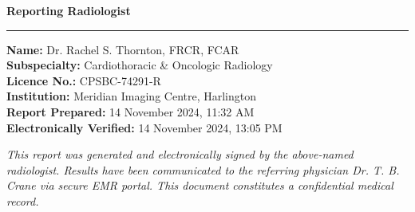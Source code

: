 \documentclass[11pt,a4paper]{article}
\newcommand{\subsectionrule}{%
  \vspace{1pt}%
  {\color{RadRule}\rule{\linewidth}{0.5pt}}%
  \vspace{3pt}%
}
\begin{document}
\vspace{10pt}


\begin{tcolorbox}[slatebox]
\noindent\textbf{\color{RadBlue}\faPen\hspace{4pt}Reporting Radiologist}
\vspace{5pt}

\subsectionrule{}

\vspace{2pt}
\noindent
\begin{minipage}[t]{0.55\linewidth}
  \small
  \textbf{Name:} Dr. Rachel S. Thornton, FRCR, FCAR\\[2pt]
  \textbf{Subspecialty:} Cardiothoracic \& Oncologic Radiology\\[2pt]
  \textbf{Licence No.:} CPSBC-74291-R\\[2pt]
  \textbf{Institution:} Meridian Imaging Centre, Harlington\\[2pt]
  \textbf{Report Prepared:} 14 November 2024, 11:32 AM\\[2pt]
  \textbf{Electronically Verified:} 14 November 2024, 13:05 PM\\[4pt]
  \begin{tcolorbox}[
    enhanced, colback=RadLight, colframe=RadTeal, arc=3pt, boxrule=0.5pt,
    left=6pt, right=6pt, top=4pt, bottom=4pt,
  ]
    \tiny\color{RadSlate}
    \textit{This report was generated and electronically signed by the above-named radiologist. Results have been communicated to the referring physician Dr. T. B. Crane via secure EMR portal. This document constitutes a confidential medical record.}
  \end{tcolorbox}
\end{minipage}%
\hfill
\begin{minipage}[t]{0.40\linewidth}
  \vspace{2mm}


\end{minipage}
\end{tcolorbox}
\end{document}
